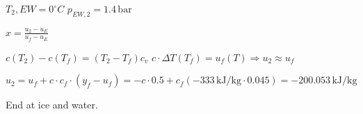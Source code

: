 \( T_2, EW = 0^\circ C \)  
\( p_{EW,2} = 1.4 \, \text{bar} \)  

\( x = \frac{u_2 - u_E}{u_f - u_E} \)  

\( c(T_2) - c(T_f) = (T_2 - T_f)c_v \)  
\( c \cdot \Delta T(T_f) = u_f(T) \Rightarrow u_2 \approx u_f \)  

\( u_2 = u_f + c \cdot c_f \cdot (y_f - u_f) = -c \cdot 0.5 + c_f(-333 \, \text{kJ/kg} \cdot 0.045) = -200.053 \, \text{kJ/kg} \)  

End at ice and water.